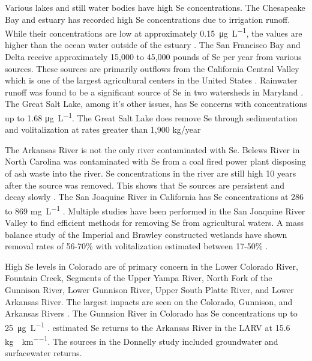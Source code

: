 \begin{linenumbers}[1]
Various lakes and still water bodies have high Se concentrations.  The Chesapeake Bay and estuary has recorded high Se concentrations due to irrigation runoff.  While their concentrations are low at approximately \SI{0.15}{\micro\gram\per\liter}, the values are higher than the ocean water outside of the estuary \parencite{Takayanagi1984}.  The San Francisco Bay and Delta receive approximately 15,000 to 45,000 pounds of Se per year from various sources.  These sources are primarily outflows from the California Central Valley which is one of the largest agricultural centers in the United States \parencite{2000luoma}.  Rainwater runoff was found to be a significant source of Se in two watersheds in Maryland \parencite{Lawson2001}.  The Great Salt Lake, among it's other issues, has Se concerns with concentrations up to 1.68 \si{\micro\gram\per\liter}.  The Great Salt Lake does remove Se through sedimentation and volitalization at rates greater than 1,900 kg/year \parencite{2008naftz,oliver2009}

The Arkansas River is not the only river contaminated with Se.  Belews River in North Carolina was contaminated with Se from a coal fired power plant disposing of ash waste into the river.  Se concentrations in the river are still high 10 years after the source was removed.  This shows that Se sources are persistent and decay slowly \parencite{Lemly2002}.   The San Joaquine River in California has Se concentrations at 286 to 869 \si{\milli\gram\per\liter} \parencite{Clifton1989}.  Multiple studies have been performed in the San Joaquine River Valley to find efficient methods for removing Se from agricultural waters.  A mass balance study of the Imperial and Brawley constructed wetlands have shown removal rates of 56-70\% with volitalization estimated between 17-50\% \parencite{Gersberg2006}.

High Se levels in Colorado are of primary concern in the Lower Colorado River, Fountain Creek, Segments of the Upper Yampa River, North Fork of the Gunnison River, Lower Gunnison River, Upper South Platte River, and Lower Arkansas River.  The largest impacts are seen on the Colorado, Gunnison, and Arkansas Rivers \parencite{5CCR1002}.  The Gunnsion River in Colorado has Se concentrations up to \SI{25}{\micro\gram\per\liter} \parencite{2008USBR}.  \textcite{2005Donnelly} estimated Se returns to the Arkansas River in the LARV at 15.6 \si{\kilo\gram\per\year\per\kilo\meter}.  The sources in the Donnelly study included groundwater and surfacewater returns.


\end{linenumbers}
